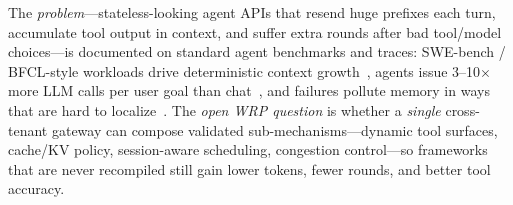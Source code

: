 \begin{opportunity}
\label{opp:gateway-agent-loops}
The \emph{problem}---stateless-looking agent APIs that resend huge
prefixes each turn, accumulate tool output in context, and suffer
extra rounds after bad tool/model choices---is documented on standard
agent benchmarks and traces: SWE-bench / BFCL-style workloads drive
deterministic context growth~\cite{jimenez2024swebench, patil2025bfcl},
agents issue 3--10$\times$ more LLM calls per user goal than
chat~\cite{servegen2025}, and failures pollute memory in ways that are
hard to localize~\cite{agenthallu2026, driftbench2026}.  The
\emph{open WRP question} is whether a \emph{single} cross-tenant
gateway can compose validated sub-mechanisms---dynamic tool surfaces,
cache/KV policy, session-aware scheduling, congestion control---so
frameworks that are never recompiled still gain lower tokens, fewer
rounds, and better tool accuracy.


\end{opportunity}
